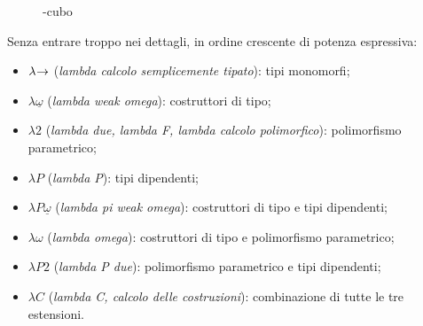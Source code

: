 \begin{figure}[H]
    \centering
    \vspace{4mm}
    \caption{\textlambda-cubo}
    \label{fig:3-lambda-cube}
    \vspace{4mm}
\end{figure}

\noindent Senza entrare troppo nei dettagli, in ordine crescente di potenza espressiva:

\begin{itemize}
    \item $\lambda\mkern-4mu\rightarrow$ (\textit{lambda calcolo semplicemente tipato}): tipi monomorfi;
    \item $\lambda\underline{\omega}$ (\textit{lambda weak omega}): costruttori di tipo;
    \item $\lambda2$ (\textit{lambda due, lambda F, lambda calcolo polimorfico}): polimorfismo parametrico;
    \item $\lambda P$ (\textit{lambda P}): tipi dipendenti;
    \item $\lambda P\underline{\omega}$ (\textit{lambda pi weak omega}): costruttori di tipo e tipi dipendenti;
    \item $\lambda\omega$ (\textit{lambda omega}): costruttori di tipo e polimorfismo parametrico;
    \item $\lambda P2$ (\textit{lambda P due}): polimorfismo parametrico e tipi dipendenti;
    \item $\lambda C$ (\textit{lambda C, calcolo delle costruzioni}): combinazione di tutte le tre estensioni.
\end{itemize}
